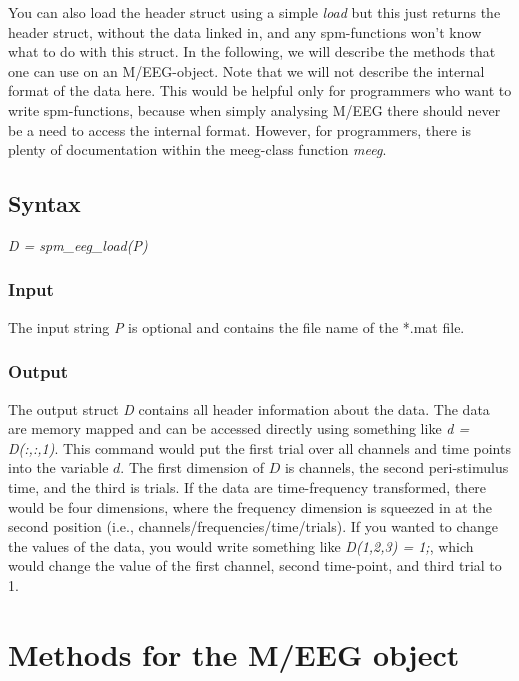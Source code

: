 You can also load the header struct using a
simple \textit{load} but this just returns the header struct, without the
data linked in, and any spm-functions won't know what to do with this
struct. In the following, we will describe the methods
that one can use on an M/EEG-object. Note that we will not describe
the internal format of the data here. This would be helpful only for
programmers who want to write spm-functions, because when simply
analysing M/EEG there should never be a need to access the internal
format. However, for programmers, there is plenty of documentation
within the meeg-class function \textit{meeg}. 

\subsection{Syntax}
\textit{D = spm\_eeg\_load(P)}
\\

\subsubsection{Input}
The input string {\textit P} is optional and contains the file name of the
*.mat file.

\subsubsection{Output}
The output struct {\textit D} contains all header information about the
data. The data are memory mapped and can be accessed directly using
something like \textit{d = D(:,:,1)}. This command would put the first
trial over all channels and time points into the variable $d$. The
first dimension of $D$ is channels, the second peri-stimulus time, and
the third is trials. If the data are time-frequency transformed, there
would be four dimensions, where the frequency dimension is squeezed in
at the second position (i.e., channels/frequencies/time/trials). If
you wanted to change the values of the data, you would write something
like \textit{D(1,2,3) = 1;}, which would change the value of the first
channel, second time-point, and third trial to 1.


\section{Methods for the M/EEG object}

